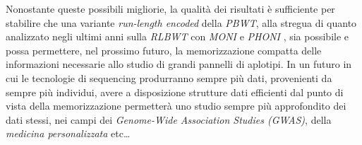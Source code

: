 \documentclass[a4paper,12pt, oneside, draft]{book}
\newcommand{\dc}[1]{\todo[backgroundcolor=yellow]{\textbf{DC} #1}}
\begin{document}
Nonostante queste possibili migliorie, la qualità dei risultati è sufficiente
per stabilire che una variante \textit{run-length encoded} della \textit{PBWT},
alla 
stregua di quanto analizzato negli ultimi anni sulla \textit{RLBWT} con
\textit{MONI} \cite{moni} e \textit{PHONI} \cite{phoni}, sia possibile e possa
permettere, nel prossimo futuro, la memorizzazione compatta delle informazioni
necessarie allo studio di grandi pannelli di aplotipi. In un futuro in cui le
tecnologie di sequencing produrranno sempre più dati, provenienti da sempre più
individui, avere a disposizione strutture dati efficienti dal punto di vista
della memorizzazione permetterà uno studio sempre più approfondito dei dati
stessi, nei campi dei \textit{Genome-Wide Association Studies (GWAS)}, della
\textit{medicina personalizzata} etc\ldots 



% 
%
% 


\end{document}
